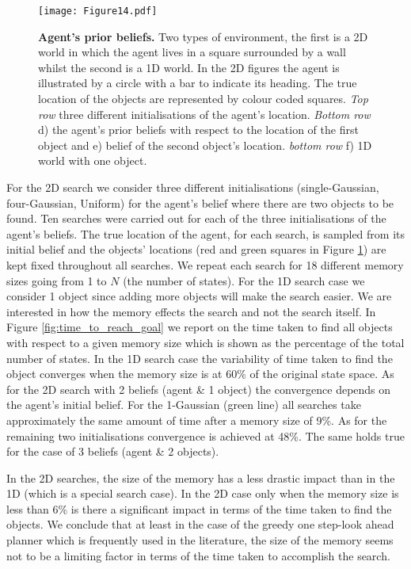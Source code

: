 \documentclass[review]{elsarticle}
\numberwithin{equation}{section}
\begin{document}
\begin{figure}
  \texttt{[image: Figure14.pdf]}
  \caption{\textbf{Agent's prior beliefs.} Two types of environment, the first is 
  a 2D world in which the agent lives in a square surrounded by a wall whilst the second is a 1D
  world. In the 2D figures the agent is illustrated by a circle with a bar to indicate its heading. The true location 
  of the objects are represented by colour coded squares. \textit{Top row} three different initialisations of the agent's location. 
  \textit{Bottom row} d) the agent's prior beliefs with respect to the location of the first object and e) belief of the second object's location.
  \textit{bottom row} f) 1D world with one object.}
  \label{fig:exploration_init}
\end{figure}

For the 2D search we consider three different initialisations (single-Gaussian, four-Gaussian, Uniform) for the agent's belief where there are 
two objects to be found. Ten searches were carried out for each of the three initialisations of the agent's beliefs. 
The true location of the agent, for each search, is sampled from its initial belief and the objects' locations 
(red and green squares in Figure \ref{fig:exploration_init}) are kept fixed throughout all searches. We repeat each search for 18 different memory 
sizes going from 1 to $N$ (the number of states). For the 1D search case we consider 1 object since adding more objects will make the search easier. 
We are interested in how the memory effects the search and not the search itself. In Figure \ref{fig:time_to_reach_goal} we report on the time taken to 
find all objects with respect to a given memory size which is shown as the percentage of the total number of states. 
In the 1D search case the variability of time taken to find the object converges when the memory size is at 60\% of the original state space. 
As for the 2D search with 2 beliefs (agent \& 1 object) the convergence depends on the agent's initial belief. For the 1-Gaussian (green line) 
all searches take approximately the same amount of time after a memory size of 9\%. As for the remaining two initialisations convergence is achieved at  48\%. 
The same holds true for the case of 3 beliefs (agent \& 2 objects).

In the 2D searches, the size of the memory has a less drastic impact than in the 1D (which is a special search case). 
In the 2D case only when the memory size is less than 6\% is there a significant impact in terms of the time taken to find 
the objects. We conclude that at least in the case of the greedy one step-look ahead planner which is frequently used in the literature, the 
size of the memory seems not to be a limiting factor in terms of the time taken to accomplish the search.
\end{document}

